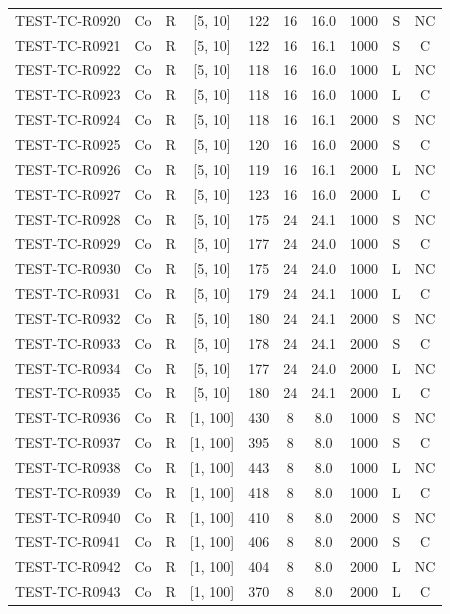 \begin{longtable}{lccccccccc}
TEST-TC-R0920 & Co & R & [5, 10] & 122 & 16 & 16.0 & 1000 & S & NC \\
TEST-TC-R0921 & Co & R & [5, 10] & 122 & 16 & 16.1 & 1000 & S & C \\
TEST-TC-R0922 & Co & R & [5, 10] & 118 & 16 & 16.0 & 1000 & L & NC \\
TEST-TC-R0923 & Co & R & [5, 10] & 118 & 16 & 16.0 & 1000 & L & C \\
TEST-TC-R0924 & Co & R & [5, 10] & 118 & 16 & 16.1 & 2000 & S & NC \\
TEST-TC-R0925 & Co & R & [5, 10] & 120 & 16 & 16.0 & 2000 & S & C \\
TEST-TC-R0926 & Co & R & [5, 10] & 119 & 16 & 16.1 & 2000 & L & NC \\
TEST-TC-R0927 & Co & R & [5, 10] & 123 & 16 & 16.0 & 2000 & L & C \\
TEST-TC-R0928 & Co & R & [5, 10] & 175 & 24 & 24.1 & 1000 & S & NC \\
TEST-TC-R0929 & Co & R & [5, 10] & 177 & 24 & 24.0 & 1000 & S & C \\
TEST-TC-R0930 & Co & R & [5, 10] & 175 & 24 & 24.0 & 1000 & L & NC \\
TEST-TC-R0931 & Co & R & [5, 10] & 179 & 24 & 24.1 & 1000 & L & C \\
TEST-TC-R0932 & Co & R & [5, 10] & 180 & 24 & 24.1 & 2000 & S & NC \\
TEST-TC-R0933 & Co & R & [5, 10] & 178 & 24 & 24.1 & 2000 & S & C \\
TEST-TC-R0934 & Co & R & [5, 10] & 177 & 24 & 24.0 & 2000 & L & NC \\
TEST-TC-R0935 & Co & R & [5, 10] & 180 & 24 & 24.1 & 2000 & L & C \\
TEST-TC-R0936 & Co & R & [1, 100] & 430 & 8 & 8.0 & 1000 & S & NC \\
TEST-TC-R0937 & Co & R & [1, 100] & 395 & 8 & 8.0 & 1000 & S & C \\
TEST-TC-R0938 & Co & R & [1, 100] & 443 & 8 & 8.0 & 1000 & L & NC \\
TEST-TC-R0939 & Co & R & [1, 100] & 418 & 8 & 8.0 & 1000 & L & C \\
TEST-TC-R0940 & Co & R & [1, 100] & 410 & 8 & 8.0 & 2000 & S & NC \\
TEST-TC-R0941 & Co & R & [1, 100] & 406 & 8 & 8.0 & 2000 & S & C \\
TEST-TC-R0942 & Co & R & [1, 100] & 404 & 8 & 8.0 & 2000 & L & NC \\
TEST-TC-R0943 & Co & R & [1, 100] & 370 & 8 & 8.0 & 2000 & L & C \\

\end{longtable}
